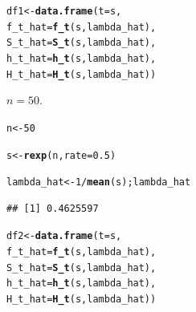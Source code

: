 \documentclass[11pt, a4paper]{article}\usepackage[]{graphicx}\usepackage[]{xcolor}
\makeatletter
\newcommand{\hlnum}[1]{\textcolor[rgb]{0.686,0.059,0.569}{#1}}%
\newcommand{\hlopt}[1]{\textcolor[rgb]{0,0,0}{#1}}%
\newcommand{\hldef}[1]{\textcolor[rgb]{0.345,0.345,0.345}{#1}}%
\newcommand{\hlkwb}[1]{\textcolor[rgb]{0.69,0.353,0.396}{#1}}%
\newcommand{\hlkwc}[1]{\textcolor[rgb]{0.333,0.667,0.333}{#1}}%
\newcommand{\hlkwd}[1]{\textcolor[rgb]{0.737,0.353,0.396}{\textbf{#1}}}%
\newenvironment{kframe}{%
 \def\at@end@of@kframe{}%
 \ifinner\ifhmode%
  \def\at@end@of@kframe{\end{minipage}}%
  \begin{minipage}{\columnwidth}%
 \fi\fi%
 \def\FrameCommand##1{\hskip\@totalleftmargin \hskip-\fboxsep
 \colorbox{shadecolor}{##1}\hskip-\fboxsep
     \hskip-\linewidth \hskip-\@totalleftmargin \hskip\columnwidth}%
 \MakeFramed {\advance\hsize-\width
   \@totalleftmargin\z@ \linewidth\hsize
   \@setminipage}}%
 {\par\unskip\endMakeFramed%
 \at@end@of@kframe}
\newenvironment{knitrout}{}{} %
\makeatother
\begin{document}
\begin{knitrout}
\color{fgcolor}\begin{kframe}
\begin{alltt}
\hldef{df1} \hlkwb{<-} \hlkwd{data.frame}\hldef{(}\hlkwc{t} \hldef{= s,}
                  \hlkwc{f_t_hat} \hldef{=} \hlkwd{f_t}\hldef{(s, lambda_hat),}
                  \hlkwc{S_t_hat} \hldef{=} \hlkwd{S_t}\hldef{(s, lambda_hat),}
                  \hlkwc{h_t_hat} \hldef{=} \hlkwd{h_t}\hldef{(s, lambda_hat),}
                  \hlkwc{H_t_hat} \hldef{=} \hlkwd{H_t}\hldef{(s, lambda_hat))}
\end{alltt}
\end{kframe}
\end{knitrout}


 $n = 50$.

\begin{knitrout}
\color{fgcolor}\begin{kframe}
\begin{alltt}
\hldef{n} \hlkwb{<-} \hlnum{50}
\end{alltt}
\end{kframe}
\end{knitrout}

\begin{knitrout}
\color{fgcolor}\begin{kframe}
\begin{alltt}
\hldef{s} \hlkwb{<-} \hlkwd{rexp}\hldef{(n,} \hlkwc{rate} \hldef{=} \hlnum{0.5}\hldef{)}
\end{alltt}
\end{kframe}
\end{knitrout}

\begin{knitrout}
\color{fgcolor}\begin{kframe}
\begin{alltt}
\hldef{lambda_hat} \hlkwb{<-} \hlnum{1} \hlopt{/} \hlkwd{mean}\hldef{(s); lambda_hat}
\end{alltt}
\begin{verbatim}
## [1] 0.4625597
\end{verbatim}
\end{kframe}
\end{knitrout}

\begin{knitrout}
\color{fgcolor}\begin{kframe}
\begin{alltt}
\hldef{df2} \hlkwb{<-} \hlkwd{data.frame}\hldef{(}\hlkwc{t} \hldef{= s,}
                  \hlkwc{f_t_hat} \hldef{=} \hlkwd{f_t}\hldef{(s, lambda_hat),}
                  \hlkwc{S_t_hat} \hldef{=} \hlkwd{S_t}\hldef{(s, lambda_hat),}
                  \hlkwc{h_t_hat} \hldef{=} \hlkwd{h_t}\hldef{(s, lambda_hat),}
                  \hlkwc{H_t_hat} \hldef{=} \hlkwd{H_t}\hldef{(s, lambda_hat))}
\end{alltt}
\end{kframe}
\end{knitrout}
\end{document}
